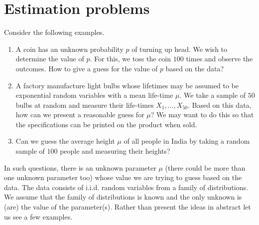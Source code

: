 \documentclass[preprint,  11pt]{amsart}
\theoremstyle{plain} %
\theoremstyle{definition} %
\begin{document}
\section{Estimation problems}
Consider the following examples.
\begin{enumerate}\setlength\itemsep{6pt}
\item A coin has an unknown probability $p$ of turning up head. We wish to determine the value of $p$. For this, we toss the coin $100$ times and observe the outcomes. How to give a guess for the value of $p$ based on the data?
\item A factory manufacture light bulbs whose lifetimes may be assumed to be exponential random variables with a mean life-time $\mu$. We take a sample of $50$ bulbs at random and measure their life-times $X_{1},\ldots ,X_{50}$. Based on this data, how can we present a reasonable guess for $\mu$? We may want to do this so that the specifications can be printed on the product when sold. 
\item Can we guess the average height $\mu$ of all people in India by taking a random sample of $100$ people and measuring their heights?
\end{enumerate}
In such questions, there is an unknown parameter $\mu$ (there could be more than one unknown parameter too) whose value we are trying to guess based on the data. The data consists of i.i.d. random variables from a family of distributions. We assume that the family of distributions is known and the only unknown is (are) the value of the parameter(s). 
 Rather than present the ideas in abstract let us see a few examples.
 
\end{document}
